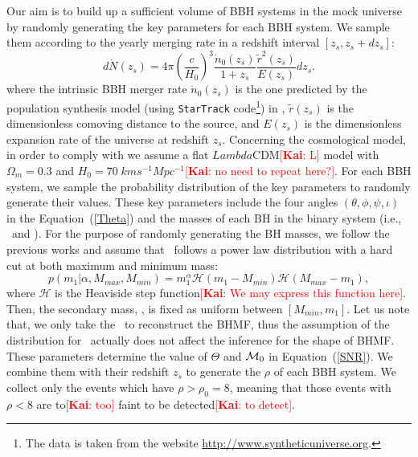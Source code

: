 \documentclass[twocolumn]{aastex62}
\newcommand{\kai}[1]{\textcolor{red}{[{\bf Kai}: #1]}}
\begin{document}
Our aim is to build up a sufficient volume of BBH systems in the mock universe by randomly generating the key parameters for each BBH system. We sample them according to the yearly merging rate in a redshift interval  $[z_{s}, z_{s}+dz_{s}]$:
 \begin{equation}
 d\dot{N} (z_s)=4\pi\left(\frac{c}{H_{0}}\right)^3\frac{\dot{n}_{0}(z_{s})}{1+z_{s}}\frac{\tilde{r}^2(z_{s})}{E(z_{s})}dz_{s}. 
 \end{equation}
where the intrinsic BBH merger rate $\dot{n}_{0}(z_{s})$ is the one predicted by the population synthesis model (using {\tt StarTrack} code\footnote{The data is taken from the website \url{http://www.syntheticuniverse.org}.}) in \citet{Dominik13}, $\tilde{r}(z_{s})$ is the dimensionless comoving distance to the source, and $E (z_s)$ is
the dimensionless expansion rate of the universe at redshift $z_s$. 
Concerning the cosmological model, in order to comply with \citet{Dominik13} we assume a flat $Lambda$CDM\kai{L} model with $\Omega_m = 0.3$ and $H_0 = 70 \; km s^{-1} Mpc^{-1}$\kai{no need to repeat here?}.
For each BBH system, we sample the probability distribution of the key parameters to randomly generate their values. These key parameters include the four angles $(\theta, \phi, \psi, \iota)$ in the Equation~(\ref{Theta})  and the masses of each BH in the binary system (i.e., \mone\ and \mtwo).
For the purpose of randomly generating the BH masses, we follow the previous works \citep{Kovetz2017PhRvD, Abbott2018b, Fishbach2018} and assume that \mone\ follows a power law distribution with a hard cut at both maximum and minimum mass:
 \begin{equation} \label{equ_powlaw}
p(m_1|\alpha, M_{max}, M_{min}) = m_1^{\alpha} \mathcal{H}(m_1-M_{min}) \mathcal{H}(M_{max}-m_1),
 \end{equation}
where $\mathcal{H}$ is the Heaviside step function\kai{We may express this function here}. Then, the secondary mass, \mtwo, is fixed as uniform between $[M_{min}, m_1]$. Let us note that, we only take the \mone\ to reconstruct the BHMF, thus the assumption of the distribution for \mtwo\ actually does not affect the inference for the shape of BHMF. These parameters determine the value of $\Theta$ and ${\cal M}_0$ in Equation~(\ref{SNR}). We combine them with their redshift $z_s$ to generate the $\rho$ of each BBH system. We collect only the events which have $\rho > \rho_0 = 8$, meaning that those events with $\rho < 8$ are to\kai{too} faint to be detected\kai{to detect}. 
\end{document}
